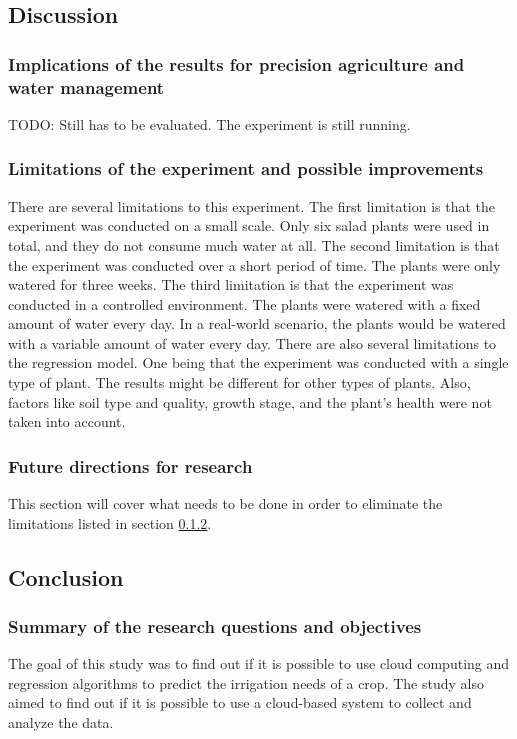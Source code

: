 \documentclass[11pt]{scrartcl} %
\begin{document}
\subsection{Discussion}
\subsubsection{Implications of the results for precision agriculture and water management}
TODO: Still has to be evaluated. The experiment is still running.

\subsubsection{Limitations of the experiment and possible improvements}
\label{sec:limitations}
There are several limitations to this experiment. The first limitation is that the experiment was conducted on a small scale. Only six salad plants were used in total, and they do not consume much water at all. The second limitation is that the experiment was conducted over a short period of time. The plants were only watered for three weeks. The third limitation is that the experiment was conducted in a controlled environment. The plants were watered with a fixed amount of water every day. In a real-world scenario, the plants would be watered with a variable amount of water every day.
\newline There are also several limitations to the regression model. One being that the experiment was conducted with a single type of plant. The results might be different for other types of plants. Also, factors like soil type and quality, growth stage, and the plant's health were not taken into account.

\subsubsection{Future directions for research}
This section will cover what needs to be done in order to eliminate the limitations listed in section \ref{sec:limitations}.

\subsection{Conclusion}
\subsubsection{Summary of the research questions and objectives}
The goal of this study was to find out if it is possible to use cloud computing and regression algorithms to predict the irrigation needs of a crop. The study also aimed to find out if it is possible to use a cloud-based system to collect and analyze the data.
\end{document}
